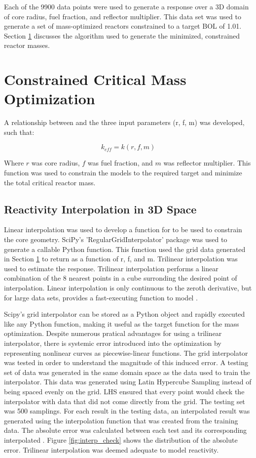 Each of the 9900 data points were used to generate a \keff response over a 3D
domain of core radius, fuel fraction, and reflector multiplier. This data set was used to
generate a set of mass-optimized reactors constrained to a target BOL \keff of
1.01. Section \ref{sec:crit_rad_search} discusses the algorithm used to generate
the minimized, constrained reactor masses.

\section{Constrained Critical Mass Optimization}\label{sec:crit_rad_search}
A relationship between \keff and the three input
parameters (r, f, m) was developed, such that:

\begin{equation}
    k_{eff} = k(r, f, m)
\label{eq:gen_keff}
\end{equation}

Where $r$ was core radius, $f$ was fuel fraction, and $m$ was reflector multiplier. This
function was used to constrain the models to the required \keff target and
minimize the total critical reactor mass.

\subsection{Reactivity Interpolation in 3D Space}
Linear interpolation was used to develop a function for \keff to be used to
constrain the core geometry. SciPy's 'RegularGridInterpolator' package was used
to generate a callable Python function. This function used the grid data
generated in Section \ref{sec:crit_rad_search} to return \keff as a function of
r, f, and m. Trilinear interpolation was used to estimate the \keff response.
Trilinear interpolation performs a linear combination of the 8 nearest points in
a cube surronding the desired point of interpolation. Linear interpolation is
only continuous to the zeroth derivative, but for large data sets, provides a
fast-executing function to model \keff.

Scipy's grid interpolator can be stored as a Python object and rapidly executed like any
Python function, making it useful as the target function for the mass
optimization. Despite numerous pratical advantages for using a trilinear
interpolator, there is systemic error introduced into the optimization by
representing nonlinear curves as piecewise-linear functions. The grid
interpolator was tested in order to understand the magnitude of this induced
error. A testing set of data was generated in the same domain space as the data
used to train the interpolator. This data was generated using Latin Hypercube
Sampling instead of being spaced evenly on the grid. LHS ensured that every
point would check the interpolator with data that did not come directly from
the grid. The testing set was 500 \keff samplings. For each \keff result in the
testing data, an interpolated result was generated using the interpolation
function that was created from the training data. The absolute error was calculated
between each test \keff and its corresponding interpolated \keff. Figure
\ref{fig:interp_check} shows the distribution of the absolute error. Trilinear
interpolation was deemed adequate to model reactivity.

